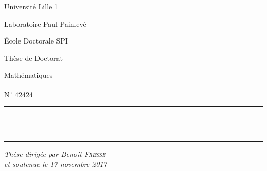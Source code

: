 
\begin{titlepage}
  \sffamily
  \begin{center}
    \begin{minipage}{0.25\linewidth}
      Université Lille 1

      Laboratoire Paul Painlevé

      École Doctorale SPI
    \end{minipage}%
    \begin{minipage}{0.5\linewidth}
    \end{minipage}%
    \begin{minipage}{0.25\linewidth}
      \raggedleft
      Thèse de Doctorat

      Mathématiques

      N\textsuperscript{o} 42424
    \end{minipage}

    \vspace{3.5cm}

    \rule{\linewidth}{1pt}%
    \\[1\baselineskip]%
    {\bfseries\fontsize{40}{48}\selectfont\mytitle}\\[0.5\baselineskip]%
    \rule{\linewidth}{1pt}

    \vspace{1.5cm}
    {\Huge\myauthor}

    \vspace{3cm}
    \textit{\Large Thèse dirigée par Benoit \textsc{Fresse}\\et soutenue le 17 novembre 2017}
  \end{center}


\end{titlepage}
